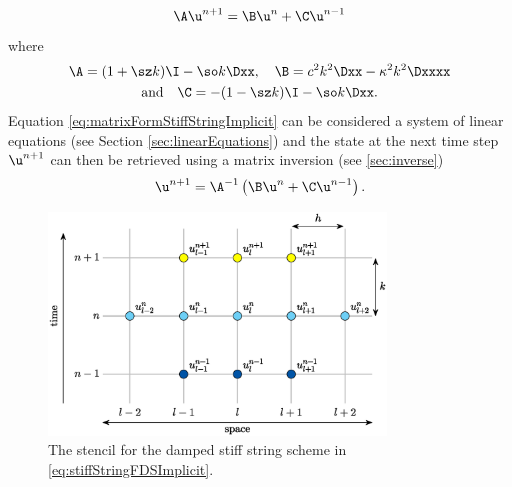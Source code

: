 {\begin{equation}\label{eq:matrixFormStiffStringImplicit}
    \A\u^{n+1} = \B\u^n + \C \u^{n-1}
\end{equation}
where 
\begin{equation*}
    \begin{gathered}
    \A = (1+\sz k)\I - \so k\Dxx, \quad \B = c^2 k^2 \Dxx - \kappa^2 k^2 \Dxxxx \\
    \text{and} \quad \C = -(1-\sz k)\I - \so k \Dxx.
    \end{gathered}
\end{equation*}
Equation \eqref{eq:matrixFormStiffStringImplicit} can be considered a system of linear equations (see Section \ref{sec:linearEquations}) and the state at the next time step $\u^{n+1}$ can then be retrieved using a matrix inversion (see \ref{sec:inverse})
\begin{equation}
    \u^{n+1} = \A^{-1}\left(\B\u^n + \C \u^{n-1}\right).
\end{equation}
\begin{figure}[h]
    \centering
    \includegraphics[width=0.8\textwidth]{figures/resonators/stencilImplicitStiffString.eps}
    \caption{The stencil for the damped stiff string scheme in \eqref{eq:stiffStringFDSImplicit}.\label{fig:stencilStiffStringImplicit}}
\end{figure}

}
